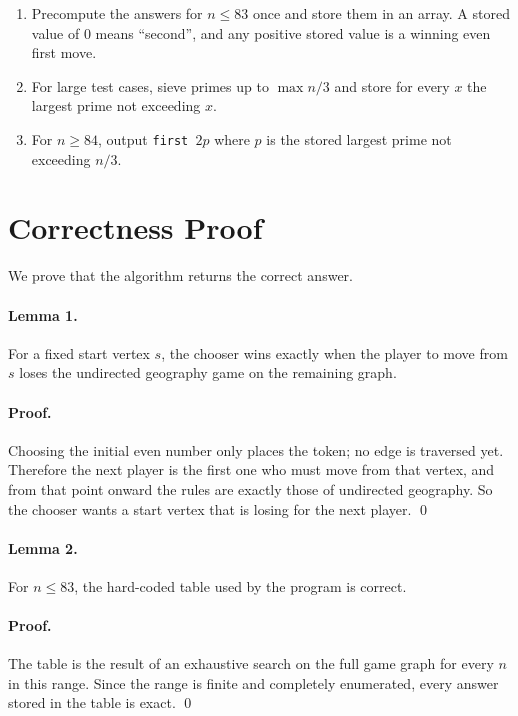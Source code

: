 \documentclass[11pt]{article}
\begin{document}
\begin{enumerate}[leftmargin=*]
    \item Precompute the answers for $n \le 83$ once and store them in an array. A stored value of $0$
    means ``second'', and any positive stored value is a winning even first move.
    \item For large test cases, sieve primes up to $\max n / 3$ and store for every $x$ the largest prime
    not exceeding $x$.
    \item For $n \ge 84$, output \texttt{first $2p$} where $p$ is the stored largest prime not exceeding $n/3$.
\end{enumerate}

\section*{Correctness Proof}

We prove that the algorithm returns the correct answer.

\paragraph{Lemma 1.}
For a fixed start vertex $s$, the chooser wins exactly when the player to move from $s$ loses the
undirected geography game on the remaining graph.

\paragraph{Proof.}
Choosing the initial even number only places the token; no edge is traversed yet. Therefore the next
player is the first one who must move from that vertex, and from that point onward the rules are exactly
those of undirected geography. So the chooser wants a start vertex that is losing for the next player. \qed

\paragraph{Lemma 2.}
For $n \le 83$, the hard-coded table used by the program is correct.

\paragraph{Proof.}
The table is the result of an exhaustive search on the full game graph for every $n$ in this range. Since
the range is finite and completely enumerated, every answer stored in the table is exact. \qed
\end{document}
